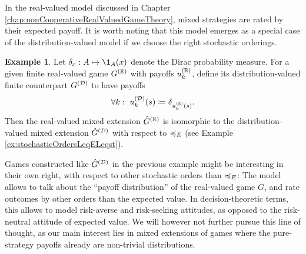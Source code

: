 \documentclass[a4paper,DIV=11]{scrreprt}
\theoremstyle{definition}
\newtheorem{ex}[thm]{Example} %
\begin{document}
    In the real-valued model discussed in Chapter \ref{chap:nonCooperativeRealValuedGameTheory}, mixed strategies are rated by their expected payoff. It is worth noting that this model emerges as a special case of the distribution-valued model if we choose the right stochastic orderings.
    \begin{ex}
        Let $\delta_x: A \mapsto \1_A(x)$ denote the Dirac probability measure.
        For a given finite real-valued game $G^{(\mathbb{R})}$ with payoffs $u_k^{(\mathbb{R})}$, define its distribution-valued finite counterpart $G^{(\mathcal{D})}$ to have payoffs
        \begin{gather*}
            \forall k: ~u_k^{(\mathcal{D})}(s) \coloneqq \delta_{u_k^{(\mathbb{R})}(s)}.
        \end{gather*}
        Then the real-valued mixed extension $\hat{G}^{(\mathbb{R})}$ is isomorphic to the distribution-valued mixed extension $\hat{G}^{(\mathcal{D})}$ with respect to $\preccurlyeq_E$ (see Example \ref{ex:stochasticOrdersLeqELeqst}).
    \end{ex}
    Games constructed like $\hat{G}^{(\mathcal{D})}$ in the previous example might be interesting in their own right, with respect to other stochastic orders than $\preccurlyeq_E$:
    The model allows to talk about the “payoff distribution” of the real-valued game $G$, and rate outcomes by other orders than the expected value. 
    In decision-theoretic terms, this allows to model risk-averse and risk-seeking attitudes, as opposed to the risk-neutral attitude of expected value. We will however not further pursue this line of thought, as our main interest lies in mixed extensions of games where the pure-strategy payoffs already are non-trivial distributions.

    
\end{document}
